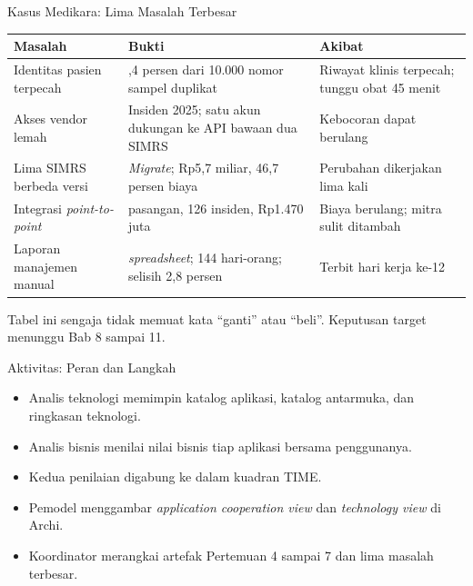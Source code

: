 \documentclass[aspectratio=169, table, 12pt]{beamer}
\begin{document}
\begin{frame}{{\Large Kasus Medikara: Lima Masalah Terbesar}}
  \scriptsize
  \begin{tabularx}{\textwidth}{>{\raggedright\arraybackslash}p{3.3cm}>{\raggedright\arraybackslash}X>{\raggedright\arraybackslash}p{4.6cm}}
    \hline
    \textbf{Masalah} & \textbf{Bukti} & \textbf{Akibat} \\
    \hline
    Identitas pasien terpecah & 11,4 persen dari 10.000 nomor sampel duplikat & Riwayat klinis terpecah; tunggu obat 45 menit \\
    \hline
    Akses vendor lemah & Insiden 2025; satu akun dukungan ke API bawaan dua SIMRS & Kebocoran dapat berulang \\
    \hline
    Lima SIMRS berbeda versi & \textit{Migrate}; Rp5,7 miliar, 46,7 persen biaya & Perubahan dikerjakan lima kali \\
    \hline
    Integrasi \textit{point-to-point} & 21 pasangan, 126 insiden, Rp1.470 juta & Biaya berulang; mitra sulit ditambah \\
    \hline
    Laporan manajemen manual & 23 \textit{spreadsheet}; 144 hari-orang; selisih 2,8 persen & Terbit hari kerja ke-12 \\
    \hline
  \end{tabularx}

  \vspace{8pt}
  \small Tabel ini sengaja tidak memuat kata ``ganti'' atau ``beli''. Keputusan target menunggu Bab 8 sampai 11.
\end{frame}

\begin{frame}{{\Large Aktivitas: Peran dan Langkah}}
  \vspace{10pt}
  \begin{itemize}
    \item Analis teknologi memimpin katalog aplikasi, katalog antarmuka, dan ringkasan teknologi.
    \item Analis bisnis menilai nilai bisnis tiap aplikasi bersama penggunanya.
    \item Kedua penilaian digabung ke dalam kuadran TIME.
    \item Pemodel menggambar \textit{application cooperation view} dan \textit{technology view} di Archi.
    \item Koordinator merangkai artefak Pertemuan 4 sampai 7 dan lima masalah terbesar.
  \end{itemize}
\end{frame}
\end{document}
